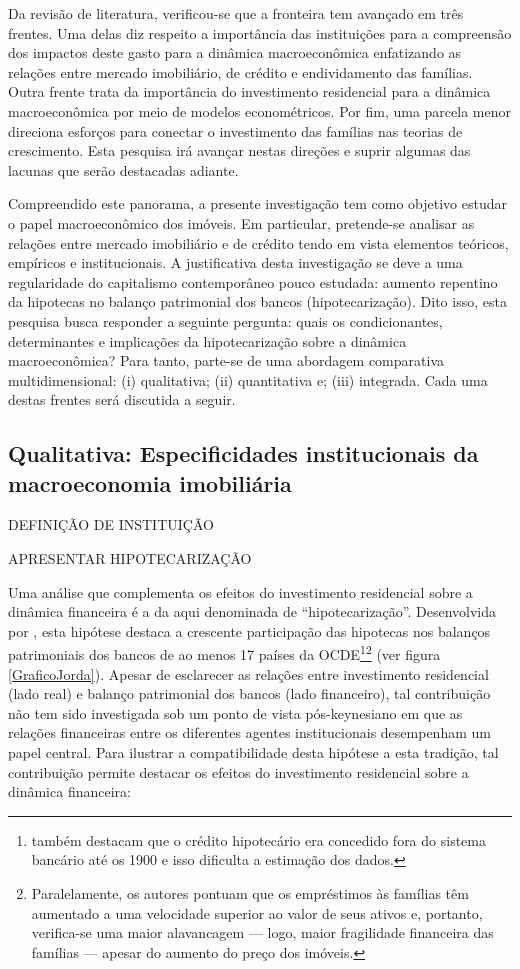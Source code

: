 Da revisão de literatura, verificou-se que a fronteira tem avançado em três frentes. Uma delas diz respeito a importância das instituições para a compreensão dos impactos deste gasto para a dinâmica macroeconômica enfatizando as relações entre mercado imobiliário, de crédito e endividamento das famílias.
Outra frente trata da importância do investimento residencial para a dinâmica macroeconômica por meio de modelos econométricos.  
Por fim, uma parcela menor direciona esforços para conectar o investimento das famílias nas teorias de crescimento. Esta pesquisa irá avançar nestas direções e suprir algumas das lacunas que serão destacadas adiante.


Compreendido este panorama, a presente investigação tem como objetivo estudar o papel macroeconômico dos imóveis.
Em particular, pretende-se analisar as relações entre mercado imobiliário e de crédito tendo em vista elementos teóricos, empíricos e institucionais. 
A justificativa desta investigação se deve a uma regularidade do capitalismo contemporâneo pouco estudada: aumento repentino da hipotecas no balanço patrimonial dos bancos (hipotecarização).
Dito isso, esta pesquisa busca responder a seguinte pergunta: quais os condicionantes, determinantes e implicações da hipotecarização sobre a dinâmica macroeconômica?
Para tanto, parte-se de uma abordagem comparativa multidimensional: (i) qualitativa; (ii) quantitativa e; (iii) integrada.
Cada uma destas frentes será discutida a seguir.



\subsection{Qualitativa: Especificidades institucionais da macroeconomia imobiliária}


DEFINIÇÃO DE INSTITUIÇÃO

APRESENTAR HIPOTECARIZAÇÃO

Uma análise que complementa os efeitos do investimento residencial sobre a dinâmica financeira é a da aqui denominada de ``hipotecarização''. 
Desenvolvida por \textcite{jorda_great_2014}, esta hipótese destaca a crescente participação das hipotecas nos balanços patrimoniais dos bancos de ao menos 17 países da OCDE\footnote{\textcite{jorda_great_2014} também destacam que o crédito hipotecário era concedido fora do sistema bancário até os 1900 e isso dificulta a estimação dos dados.}\footnote{Paralelamente, os autores pontuam que os empréstimos às famílias têm aumentado a uma velocidade superior ao valor de seus ativos e, portanto, verifica-se uma maior alavancagem --- logo, maior fragilidade financeira das famílias --- apesar do aumento do preço dos imóveis.} (ver figura \ref{GraficoJorda}).
Apesar de esclarecer as relações entre investimento residencial (lado real) e balanço patrimonial dos bancos (lado financeiro), tal contribuição não tem sido investigada sob um ponto de vista pós-keynesiano em que as relações financeiras entre os diferentes agentes institucionais desempenham um papel central. Para ilustrar a compatibilidade desta hipótese a esta tradição, tal contribuição permite destacar os efeitos do investimento residencial sobre a dinâmica financeira: 

